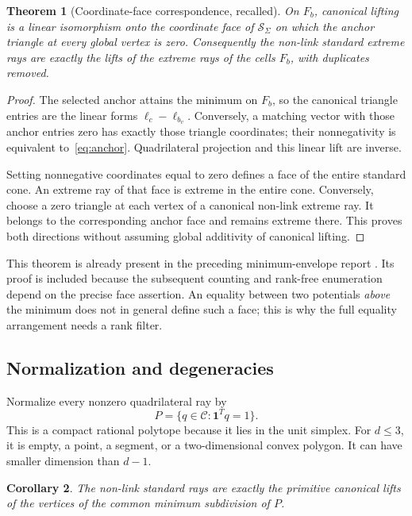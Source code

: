 \documentclass[11pt,letterpaper]{article}
\newtheorem{theorem}{Theorem}[section]
\newtheorem{corollary}[theorem]{Corollary}
\theoremstyle{definition}
\theoremstyle{remark}\newtheorem{remark}[theorem]{Remark}
\newcommand{\cone}{\mathcal C}\newcommand{\stdcone}{\mathcal S}
\begin{document}
\begin{theorem}[Coordinate-face correspondence, recalled]
\label{thm:face}
On $F_b$, canonical lifting is a linear isomorphism onto the coordinate
face of $\stdcone_\Sigma$ on which the anchor triangle at every global
vertex is zero. Consequently the non-link standard extreme rays are exactly
the lifts of the extreme rays of the cells $F_b$, with duplicates removed.
\end{theorem}

\begin{proof}
The selected anchor attains the minimum on $F_b$, so the canonical
triangle entries are the linear forms $\ell_c-\ell_{b_v}$. Conversely,
a matching vector with those anchor entries zero has exactly those triangle
coordinates; their nonnegativity is equivalent to~\eqref{eq:anchor}.
Quadrilateral projection and this linear lift are inverse.

Setting nonnegative coordinates equal to zero defines a face of the entire
standard cone. An extreme ray of that face is extreme in the entire cone.
Conversely, choose a zero triangle at each vertex of a canonical non-link
extreme ray. It belongs to the corresponding anchor face and remains extreme
there. This proves both directions without assuming global additivity of
canonical lifting.
\end{proof}

This theorem is already present in the preceding minimum-envelope report
\cite{minimumenvelopes}. Its proof is included because the subsequent
counting and rank-free enumeration depend on the precise face assertion.
An equality between two potentials \emph{above} the minimum does not in
general define such a face; this is why the full equality arrangement needs
a rank filter.

\subsection{Normalization and degeneracies}

Normalize every nonzero quadrilateral ray by
\begin{equation}
 P=\{q\in\cone:\mathbf1^Tq=1\}.
 \label{eq:section}
\end{equation}
This is a compact rational polytope because it lies in the unit simplex.
For $d\le3$, it is empty, a point, a segment, or a two-dimensional convex
polygon. It can have smaller dimension than $d-1$.

\begin{corollary}
\label{cor:vertices}
The non-link standard rays are exactly the primitive canonical lifts of
the vertices of the common minimum subdivision of $P$.
\end{corollary}
\end{document}
